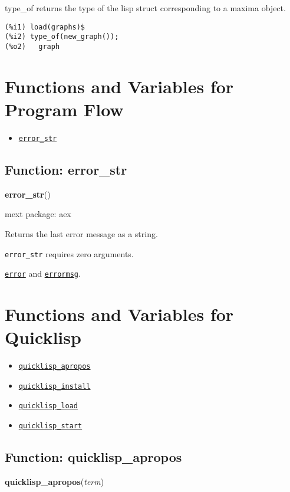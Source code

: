 \documentclass[]{article}
\begin{document}
   type\_of returns the type of the lisp struct corresponding to a maxima 
   object. 

\begin{Verbatim}[frame=single]
(%i1) load(graphs)$
(%i2) type_of(new_graph());
(%o2)   graph
\end{Verbatim}


\section{Functions and Variables for Program Flow}
\begin{itemize}
\item \hyperlink{error_str}{{\tt error\_str}}
\end{itemize}
\subsection{Function: error\_str\label{sec:error_str}}
\hypertarget{error_str}{}
{\bf error\_str}()


\noindent mext package: aex



\vspace{5 pt}
Returns the last error message as a string. 

\vspace{5 pt}

   {\tt error\_str} requires zero arguments.


\vspace{5 pt}


 \hyperlink{error}{{\tt error}} and \hyperlink{errormsg}{{\tt errormsg}}.

\vspace{5 pt}


\section{Functions and Variables for Quicklisp}
\begin{itemize}
\item \hyperlink{quicklisp_apropos}{{\tt quicklisp\_apropos}}
\item \hyperlink{quicklisp_install}{{\tt quicklisp\_install}}
\item \hyperlink{quicklisp_load}{{\tt quicklisp\_load}}
\item \hyperlink{quicklisp_start}{{\tt quicklisp\_start}}
\end{itemize}
\subsection{Function: quicklisp\_apropos\label{sec:quicklisp_apropos}}
\hypertarget{quicklisp_apropos}{}
{\bf quicklisp\_apropos}({\it term})
\end{document}
